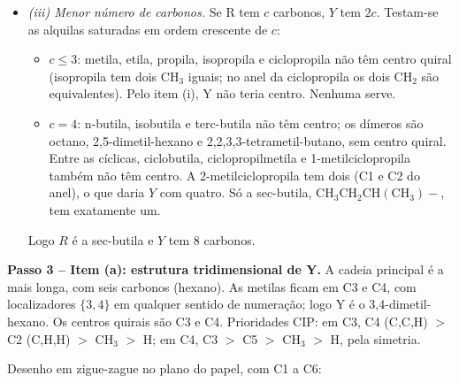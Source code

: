 \documentclass{article}%
\begin{document}
\begin{itemize}
\item \emph{(iii) Menor número de carbonos.} Se R tem $c$ carbonos, $Y$ tem $2c$. Testam-se as alquilas saturadas em ordem crescente de $c$:
\begin{itemize}
\item $c \le 3$: metila, etila, propila, isopropila e ciclopropila não têm centro quiral (isopropila tem dois CH$_3$ iguais; no anel da ciclopropila os dois CH$_2$ são equivalentes). Pelo item (i), Y não teria centro. Nenhuma serve.
\item $c = 4$: n-butila, isobutila e terc-butila não têm centro; os dímeros são octano, 2,5-dimetil-hexano e 2,2,3,3-tetrametil-butano, sem centro quiral. Entre as cíclicas, ciclobutila, ciclopropilmetila e 1-metilciclopropila também não têm centro. A 2-metilciclopropila tem dois (C1 e C2 do anel), o que daria $Y$ com quatro. Só a sec-butila, $\mathrm{CH_3CH_2CH(CH_3){-}}$, tem exatamente um.
\end{itemize}
Logo $R$ é a sec-butila e $Y$ tem 8 carbonos.
\end{itemize}

\textbf{Passo 3 -- Item (a): estrutura tridimensional de Y.} A cadeia principal é a mais longa, com seis carbonos (hexano). As metilas ficam em C3 e C4, com localizadores $\{3,4\}$ em qualquer sentido de numeração; logo Y é o 3,4-dimetil-hexano. Os centros quirais são C3 e C4. Prioridades CIP: em C3, C4 (C,C,H) $>$ C2 (C,H,H) $>$ CH$_3$ $>$ H; em C4, C3 $>$ C5 $>$ CH$_3$ $>$ H, pela simetria.

Desenho em zigue-zague no plano do papel, com C1 a C6:

\begin{center}
\end{center}
\end{document}
